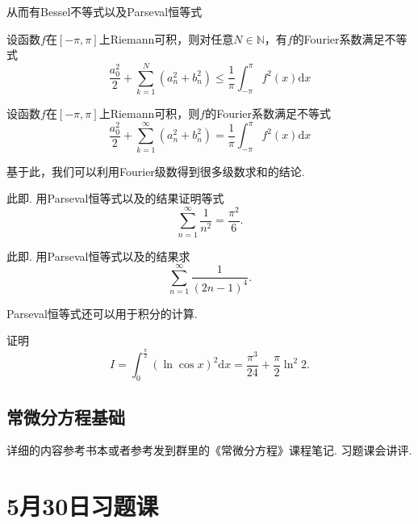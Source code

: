 \documentclass{ctexart}
\newcounter{EnvironmentCounter}
\newcommand{\renewEnvironmentCounter}{\setcounter{EnvironmentCounter}{0}}
\begin{document}
从而有Bessel不等式以及Parseval恒等式
\begin{theorem}[Bessel不等式]
设函数$f$在$[-\pi,\pi]$上Riemann可积，则对任意$N\in\mathbb{N}$，有$f$的Fourier系数满足不等式
$$\frac{a_{0}^{2}}{2}+\sum_{k=1}^{N}{(a_{n}^{2}+b_{n}^{2})}\leqslant \frac{1}{\pi}\int_{-\pi}^{\pi}{f^{2}(x)\mathrm{d}x}$$
\end{theorem}

\begin{theorem}[Parseval恒等式]
设函数$f$在$[-\pi,\pi]$上Riemann可积，则$f$的Fourier系数满足不等式
$$\frac{a_{0}^{2}}{2}+\sum_{k=1}^{\infty}{(a_{n}^{2}+b_{n}^{2})}= \frac{1}{\pi}\int_{-\pi}^{\pi}{f^{2}(x)\mathrm{d}x}$$
\end{theorem}

基于此，我们可以利用Fourier级数得到很多级数求和的结论.
\begin{example}
此即\cite[第九章\S 3习题11]{JC}. 用Parseval恒等式以及\cite[例9.3.1]{JC}的结果证明等式
$$\sum_{n=1}^{\infty}{\frac{1}{n^{2}}}=\frac{\pi^{2}}{6}.$$
\end{example}

\begin{example}
此即\cite[第九章\S 3习题11]{JC}. 用Parseval恒等式以及\cite[例9.3.2]{JC}的结果求
$$\sum_{n=1}^{\infty}{\frac{1}{(2n-1)^{4}}}.$$
\end{example}

Parseval恒等式还可以用于积分的计算.
\begin{example}
证明
$$I=\int_{0}^{\frac{\pi}{2}}{(\ln{\cos{x}})^{2}\mathrm{d}x}=\frac{\pi^{3}}{24}+\frac{\pi}{2}\ln^{2}{2}.$$
\end{example}

\subsection{常微分方程基础}
详细的内容参考书本或者参考发到群里的《常微分方程》课程笔记. 习题课会讲评\cite[P276/2,3(1)(3)(5)(7)(9)]{JC}.

\clearpage
\renewEnvironmentCounter
\section{5月30日习题课}
\end{document}
